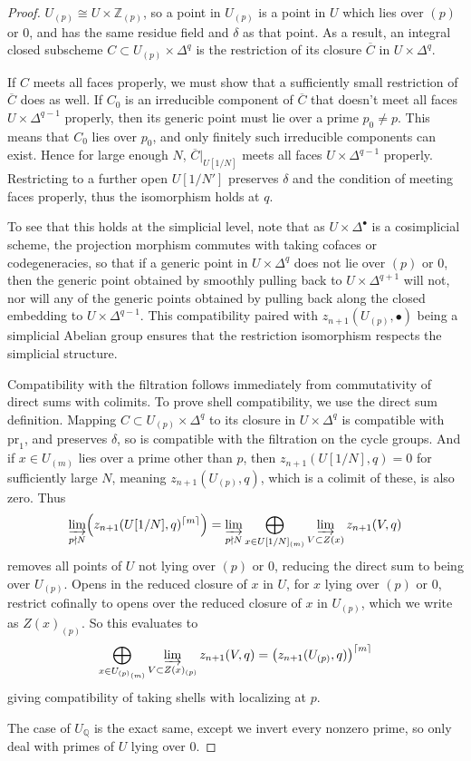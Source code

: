 \documentclass[11pt, twoside]{article}
\numberwithin{equation}{section}
\theoremstyle{definition}
\newcommand{\bb}[1]{\mathbb{#1}}
\newcommand{\colim}{\varinjlim}
\newcommand{\pr}{\mathrm{pr}}
\begin{document}
\begin{proof}
\(U_{(p)} \cong U \times \bb{Z}_{(p)}\), so a point in \(U_{(p)}\) is a point in \(U\) which lies over \((p)\) or \(0\), and has the same residue field and \(\delta\) as that point. As a result, an integral closed subscheme \(C \subset U_{(p)} \times \Delta^q\) is the restriction of its closure \(\overline{C}\) in \(U \times \Delta^q\).

If \(C\) meets all faces properly, we must show that a sufficiently small restriction of \(\overline{C}\) does as well. If \(C_0\) is an irreducible component of \(\overline{C}\) that doesn't meet all faces \(U \times \Delta^{q - 1}\) properly, then its generic point must lie over a prime \(p_0 \neq p\). This means that \(C_0\) lies over \(p_0\), and only finitely such irreducible components can exist. Hence for large enough \(N\), \(\overline{C}|_{U[1/N]}\) meets all faces \(U \times \Delta^{q - 1}\) properly. Restricting to a further open \(U[1/N']\) preserves \(\delta\) and the condition of meeting faces properly, thus the isomorphism holds at \(q\).

To see that this holds at the simplicial level, note that as \(U \times \Delta^\bullet\) is a cosimplicial scheme, the projection morphism commutes with taking cofaces or codegeneracies, so that if a generic point in \(U \times \Delta^q\) does not lie over \((p)\) or \(0\), then the generic point obtained by smoothly pulling back to \(U \times \Delta^{q + 1}\) will not, nor will any of the generic points obtained by pulling back along the closed embedding to \(U \times \Delta^{q - 1}\). This compatibility paired with \(z_{n +1}(U_{(p)}, \bullet)\) being a simplicial Abelian group ensures that the restriction isomorphism respects the simplicial structure.

Compatibility with the filtration follows immediately from commutativity of direct sums with colimits. To prove shell compatibility, we use the direct sum definition. Mapping \(C \subset U_{(p)} \times \Delta^q\) to its closure in \(U \times \Delta^q\) is compatible with \(\pr_1\), and preserves \(\delta\), so is compatible with the filtration on the cycle groups. And if \(x \in U_{(m)}\) lies over a prime other than \(p\), then \(z_{n + 1}(U[1/N], q) = 0\) for sufficiently large \(N\), meaning \(z_{n + 1}(U_{(p)}, q)\), which is a colimit of these, is also zero. Thus 
\[\colim_{p \nmid N} \! \left(z_{n + 1}(U[1/N], q)^{\lceil m \rceil}\right) = \colim_{p \nmid N} \bigoplus_{x \in U[1/N]_{(m)}} \colim_{V \subset Z(x)} z_{n + 1}(V, q)\]
removes all points of \(U\) not lying over \((p)\) or \(0\), reducing the direct sum to being over \(U_{(p)}\). Opens in the reduced closure of \(x\) in \(U\), for \(x\) lying over \((p)\) or \(0\), restrict cofinally to opens over the reduced closure of \(x\) in \(U_{(p)}\), which we write as \(Z(x)_{(p)}\). So this evaluates to 
\[\bigoplus_{x \in {U_{(p)}}_{(m)}} \colim_{V \subset Z(x)_{(p)}} z_{n + 1}(V, q) = \big(z_{n + 1}(U_{(p)}, q)\big)^{\lceil m \rceil}\]
giving compatibility of taking shells with localizing at \(p\).

The case of \(U_\bb{Q}\) is the exact same, except we invert every nonzero prime, so only deal with primes of \(U\) lying over \(0\).
\end{proof}
\end{document}
